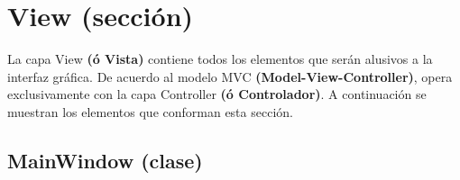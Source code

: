 \documentclass[class=report, crop=false]{standalone}
\begin{document}
\section{View (sección)}
\label{sec:a_3}
La capa View \textbf{(ó Vista)} contiene todos los elementos que 
serán alusivos a la interfaz gráfica. De acuerdo al modelo MVC 
\textbf{(Model-View-Controller)}, opera exclusivamente con la capa 
Controller \textbf{(ó Controlador)}.\medskip\break
A continuación se muestran los elementos que conforman esta sección.

\subsection{MainWindow (clase)}
\label{sec:a_3_1}
\end{document}
